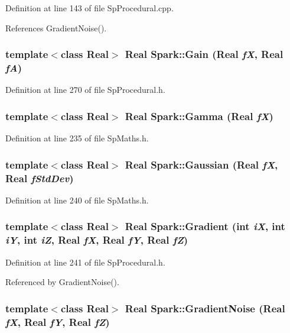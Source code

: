 Definition at line 143 of file Sp\-Procedural.cpp.

References Gradient\-Noise().
\subsubsection{\setlength{\rightskip}{0pt plus 5cm}template$<$class Real$>$ Real Spark::Gain (Real {\em f\-X}, Real {\em f\-A})}\label{namespaceSpark_a97}


Definition at line 270 of file Sp\-Procedural.h.
\subsubsection{\setlength{\rightskip}{0pt plus 5cm}template$<$class Real$>$ Real Spark::Gamma (Real {\em f\-X})}\label{namespaceSpark_a53}


Definition at line 235 of file Sp\-Maths.h.
\subsubsection{\setlength{\rightskip}{0pt plus 5cm}template$<$class Real$>$ Real Spark::Gaussian (Real {\em f\-X}, Real {\em f\-Std\-Dev})}\label{namespaceSpark_a54}


Definition at line 240 of file Sp\-Maths.h.
\subsubsection{\setlength{\rightskip}{0pt plus 5cm}template$<$class Real$>$ Real Spark::Gradient (int {\em i\-X}, int {\em i\-Y}, int {\em i\-Z}, Real {\em f\-X}, Real {\em f\-Y}, Real {\em f\-Z})}\label{namespaceSpark_a95}


Definition at line 241 of file Sp\-Procedural.h.

Referenced by Gradient\-Noise().
\subsubsection{\setlength{\rightskip}{0pt plus 5cm}template$<$class Real$>$ Real Spark::Gradient\-Noise (Real {\em f\-X}, Real {\em f\-Y}, Real {\em f\-Z})}\label{namespaceSpark_a74}


